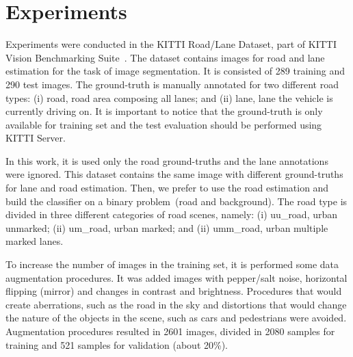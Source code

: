 \section{Experiments}
\label{sec:experiments}

Experiments were conducted in the KITTI Road/Lane Dataset, part of KITTI Vision Benchmarking Suite~\cite{KITTI}. The dataset  contains  images for road and lane estimation for the task of image segmentation. It is consisted of 289 training and 290 test images. The ground-truth is manually annotated for two different road types: (i) road, road area composing all lanes; and (ii) lane, lane the vehicle is currently driving on. It is important to notice that the ground-truth is only available for training set and the test evaluation should be performed using KITTI Server.

In this work, it is used only the road ground-truths and the lane annotations were ignored. This dataset contains the same image with different ground-truths for lane and road estimation. Then, we prefer to use the road estimation and build the classifier on a binary problem~(road and background). The road type is divided in three different categories of road scenes, namely: (i) uu\_road, urban unmarked; (ii) um\_road, urban marked; and (ii) umm\_road, urban multiple marked lanes.  

{\color{green}{Rever lista de procedimentos de data augmentation}}

To increase the number of images in the training set, it is performed some data augmentation procedures. It was added images with pepper/salt noise, horizontal flipping (mirror) and  changes in contrast and brightness. Procedures that would create aberrations, such as the road in the sky and distortions that would change the nature of the objects in the scene, such as cars and pedestrians were avoided. Augmentation procedures resulted in 2601 images, divided in 2080 samples for training and 521 samples for validation (about 20\%). 


